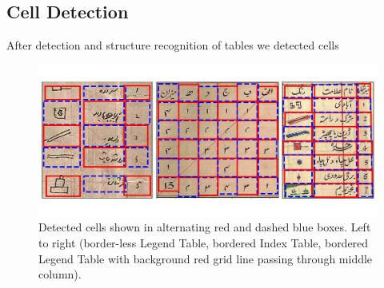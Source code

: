 \subsection{Cell Detection}
\label{sec:expResults_cell}
After detection and structure recognition of tables we detected cells
\begin{figure}[h!]
\centering
  \includegraphics[width=\linewidth, keepaspectratio,angle=0]{cellDetectionResults.pdf}
    \caption{Detected cells shown in alternating red and dashed blue boxes. Left to right (border-less Legend Table, bordered Index Table, bordered Legend Table with background red grid line passing through middle column).}
    \label{fig:cellDetectionResults}
\end{figure}
\begin{table}[h!]
\caption{Cell Detection}
\label{tbl:cell_detection}
\centering
{}
\end{table}
